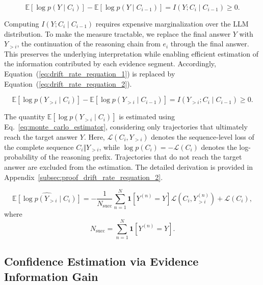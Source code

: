 \documentclass{article} %
\begin{document}
\begin{equation}
\mathbb{E}\!\left[\log p\!\left(Y\mid C_i\right)\right]
-
\mathbb{E}\!\left[\log p\!\left(Y\mid C_{i-1}\right)\right]
=
I\!\left(Y;C_i\mid C_{i-1}\right)
\geq 0.
\label{eq:drift_rate_requation_1}
\end{equation}

Computing $I(Y;C_i\mid C_{i-1})$ requires expensive marginalization over the LLM distribution. To make the measure tractable, we replace the final answer $Y$ with $Y_{>i}$, the continuation of the reasoning chain from $e_i$ through the final answer. This preserves the underlying interpretation while enabling efficient estimation of the information contributed by each evidence segment. Accordingly, Equation~(\ref{eq:drift_rate_requation_1}) is replaced by Equation~(\ref{eq:drift_rate_requation_2}).


\begin{equation}
\mathbb{E}\!\left[\log p\!\left(Y_{>i}\mid C_i\right)\right]
-
\mathbb{E}\!\left[\log p\!\left(Y_{>i}\mid C_{i-1}\right)\right]
=
I\!\left(Y_{>i};C_i\mid C_{i-1}\right)
\geq 0.
\label{eq:drift_rate_requation_2}
\end{equation}

The quantity $\mathbb{E}[\log p(Y_{>i}\mid C_i)]$ is estimated using Eq.~\ref{eq:monte_carlo_estimator}, considering only trajectories that ultimately reach the target answer $Y$. Here, $\mathcal{L}(C_i,Y_{>i})$ denotes the sequence-level loss of the complete sequence $C_i\Vert Y_{>i}$, while $\log p(C_i)=-\mathcal{L}(C_i)$ denotes the log-probability of the reasoning prefix. Trajectories that do not reach the target answer are excluded from the estimation. The detailed derivation is provided in Appendix~\ref{subsec:proof_drift_rate_requation_2}.

\begin{equation}
\widehat{
\mathbb{E}
\left[
\log p(Y_{>i}\mid C_i)
\right]
}
=
-\frac{1}{N_{\mathrm{succ}}}
\sum_{n=1}^{N}
\mathbf{1}\!\left[Y^{(n)}=Y\right]
\mathcal{L}
\left(C_i,Y_{>i}^{(n)}\right)
+
\mathcal{L}(C_i),
\label{eq:monte_carlo_estimator}
\end{equation}
where
\begin{equation}
N_{\mathrm{succ}}
=
\sum_{n=1}^{N}
\mathbf{1}\!\left[Y^{(n)}=Y\right].
\end{equation}
\subsection{Confidence Estimation via Evidence Information Gain}
\label{subsec:Confidence Estimation Method}
\end{document}
